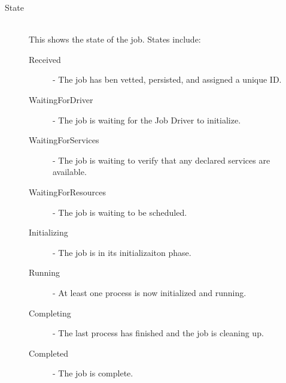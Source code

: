 \begin{description}
            \item[State] \hfill \\
              This shows the state of the job. States include:
              \begin{description}
                  \item[Received] - The job has ben vetted, persisted, and assigned a unique ID. 
                  \item[WaitingForDriver] - The job is waiting for the Job Driver to initialize. 
                  \item[WaitingForServices] - The job is waiting to verify that any declared services are available. 
                  \item[WaitingForResources] - The job is waiting to be scheduled. 
                  \item[Initializing] - The job is in its initializaiton phase. 
                  \item[Running] - At least one process is now initialized and running. 
                  \item[Completing] - The last process has finished and the job is cleaning up. 
                  \item[Completed] - The job is complete. 
              \end{description}
                  

\end{description}
